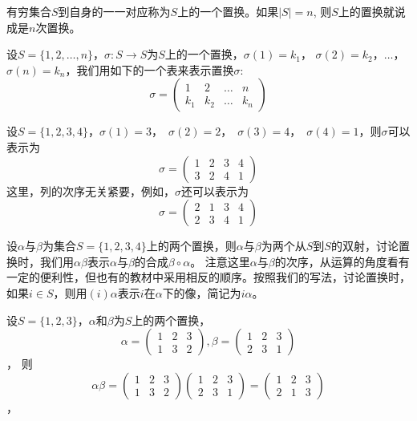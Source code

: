   \begin{Def}
    有穷集合$S$到自身的一一对应称为$S$上的一个置换。如果$|S| = n$, 则$S$上的置换就说成是$n$次置换。
  \end{Def}
设$S=\{1,2,\ldots,n\}$，$\sigma:S\to S$为$S$上的一个置换，$\sigma(1) = k_1$， $\sigma(2) = k_2$，$\ldots$，$\sigma(n) = k_n$，我们用如下的一个表来表示置换$\sigma$:
\[\sigma=\begin{pmatrix}1&2&\ldots&n\\k_1&k_2&\ldots&k_n\end{pmatrix}\]
\begin{Example}
  设$S=\{1,2,3,4\}$，$\sigma(1) = 3$，　$\sigma(2) = 2$，　$\sigma(3) = 4$，　$\sigma(4) = 1$，则$\sigma$可以表示为
  \[\sigma=\begin{pmatrix}1&2&3&4\\3&2&4&1\end{pmatrix}\]
  这里，列的次序无关紧要，例如，$\sigma$还可以表示为
  \[\sigma=\begin{pmatrix}2&1&3&4\\2&3&4&1\end{pmatrix}\]
\end{Example}

  \begin{Def}
    设$\alpha$与$\beta$为集合$S=\{1,2,3,4\}$上的两个置换，则$\alpha$与$\beta$为两个从$S$到$S$的双射，讨论置换时，我们用$\alpha\beta$表示$\alpha$与$\beta$的合成$\beta \circ \alpha$。
    注意这里$\alpha$与$\beta$的次序，从运算的角度看有一定的便利性，但也有的教材中采用相反的顺序。按照我们的写法，讨论置换时，如果$i \in S$，则用$(i)\alpha$表示$i$在$\alpha$下的像，简记为$i\alpha$。
  \end{Def}
  \begin{Example}
    设$S=\{1,2,3\}$，$\alpha$和$\beta$为$S$上的两个置换，
    \[\alpha=\begin{pmatrix}1&2&3\\1&3&2\end{pmatrix},\beta=\begin{pmatrix}1&2&3\\2&3&1\end{pmatrix}\]，
    则
    \[\alpha\beta=\begin{pmatrix}1&2&3\\1&3&2\end{pmatrix}\begin{pmatrix}1&2&3\\2&3&1\end{pmatrix}=\begin{pmatrix}1&2&3\\2&1&3\end{pmatrix}\]，    
  \end{Example}

